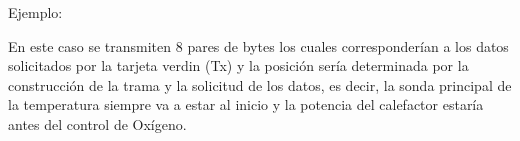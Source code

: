 \documentclass[12pt,a4paper]{article}
\begin{document}
                \begin{center}



                \end{center}
            
                Ejemplo:
            
                \begin{center}
                \end{center}
        
                En este caso se transmiten 8 pares de bytes los cuales corresponderían a los datos solicitados por la tarjeta verdin (Tx) y la posición sería determinada por la construcción de la trama y la solicitud de los datos, es decir, la sonda principal de la temperatura siempre va a estar al inicio y la potencia del calefactor estaría antes del control de Oxígeno.
\end{document}
